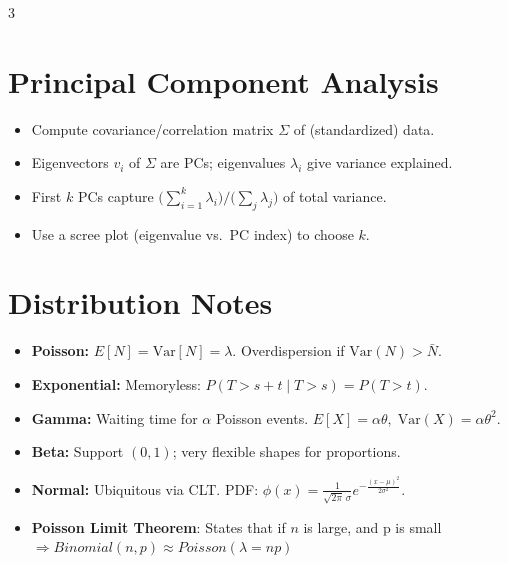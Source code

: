 \documentclass[10pt,landscape]{article}
\begin{document}
\begin{multicols}{3}
\section{Principal Component Analysis}
\begin{itemize}
  \item Compute covariance/correlation matrix $\Sigma$ of (standardized) data.
  \item Eigenvectors $v_i$ of $\Sigma$ are PCs; eigenvalues $\lambda_i$ give variance explained.
  \item First $k$ PCs capture $\displaystyle \bigl(\sum_{i=1}^k \lambda_i\bigr)\big/\bigl(\sum_j \lambda_j\bigr)$ of total variance.
  \item Use a scree plot (eigenvalue vs.\ PC index) to choose $k$.
\end{itemize}

\section{Distribution Notes}
\begin{itemize}
  \item \textbf{Poisson:} $E[N]=\mathrm{Var}[N]=\lambda$. Overdispersion if $\mathrm{Var}(N)>\bar N$.
  \item \textbf{Exponential:} Memoryless: $P(T>s+t\mid T>s)=P(T>t)$.
  \item \textbf{Gamma:} Waiting time for $\alpha$ Poisson events. $E[X]=\alpha\theta,\;\mathrm{Var}(X)=\alpha\theta^2$.
  \item \textbf{Beta:} Support $(0,1)$; very flexible shapes for proportions.
  \item \textbf{Normal:} Ubiquitous via CLT. PDF: $\displaystyle \phi(x)=\tfrac{1}{\sqrt{2\pi}\,\sigma}e^{-\frac{(x-\mu)^2}{2\sigma^2}}$.
 \item  \textbf{Poisson Limit Theorem}: States that if $n$ is large, and p is small $\Rightarrow Binomial(n, p) \approx Poisson(\lambda = np)$
\end{itemize}


\end{multicols}
\end{document}
